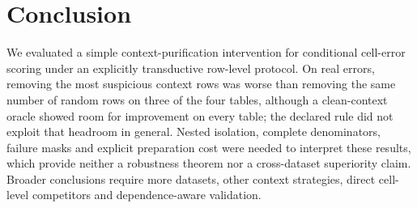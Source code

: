 \section{Conclusion}
We evaluated a simple context-purification intervention for conditional cell-error
scoring under an explicitly transductive row-level protocol. On real errors, removing
the most suspicious context rows was worse than removing the same number of random
rows on three of the four tables, although a clean-context oracle showed room for
improvement on every table; the declared rule did not exploit that headroom in general.
Nested isolation, complete denominators, failure masks and explicit preparation cost
were needed to interpret these results, which provide neither a robustness theorem nor
a cross-dataset superiority claim. Broader conclusions require more datasets, other
context strategies, direct cell-level competitors and dependence-aware validation.
